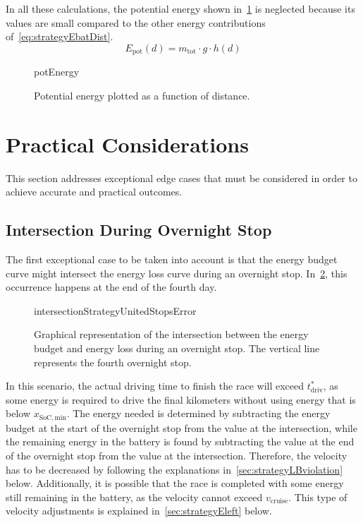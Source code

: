 In all these calculations, the potential energy shown in~\cref{fig:potEnergy} is neglected because its values are small compared to the other energy contributions of~\cref{eq:strategyEbatDist}.
\begin{equation}
	E_\mathrm{pot}(d) = m_\mathrm{tot} \cdot g \cdot h(d)
\end{equation}
\begin{figure}[htbp]
	\centering
	\begin{externalize}{potEnergy}
		
	\end{externalize}
	\caption{Potential energy plotted as a function of distance.}
	\label{fig:potEnergy}
\end{figure}

\newpage
\section{Practical Considerations}
\label{sec:strategyPracticalConsideration}
This section addresses exceptional edge cases that must be considered in order to achieve accurate and practical outcomes.


\subsection{Intersection During Overnight Stop}
\label{sec:strategyIntDuringOvernight}
The first exceptional case to be taken into account is that the energy budget curve might intersect the energy loss curve during an overnight stop. In~\ref{fig:strategyEintersectionUnitedStopsError}, this occurrence happens at the end of the fourth day.
\begin{figure}[htbp]
	\centering
	\begin{externalize}{intersectionStrategyUnitedStopsError}
		
	\end{externalize}
	\caption{Graphical representation of the intersection between the energy budget and energy loss during an overnight stop. The vertical line represents the fourth overnight stop.}
	\label{fig:strategyEintersectionUnitedStopsError}
\end{figure}

In this scenario, the actual driving time to finish the race will exceed $t_\mathrm{driv}^*$, as some energy is required to drive the final kilometers without using energy that is below $x_\mathrm{SoC,min}$. The energy needed is determined by subtracting the energy budget at the start of the overnight stop from the value at the intersection, while the remaining energy in the battery is found by subtracting the value at the end of the overnight stop from the value at the intersection. Therefore, the velocity has to be decreased by following the explanations in~\cref{sec:strategyLBviolation} below. Additionally, it is possible that the race is completed with some energy still remaining in the battery, as the velocity cannot exceed $v_\mathrm{cruise}$. This type of velocity adjustments is explained in~\cref{sec:strategyEleft} below.


